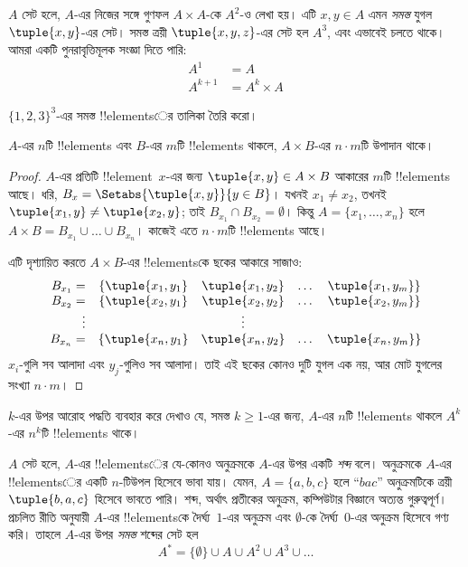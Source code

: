 \documentclass[../../../include/open-logic-section]{subfiles}
\begin{document}
\begin{ex}
$A$ সেট হলে, $A$-এর নিজের সঙ্গে গুণফল $A \times A$-কে $A^2$-ও
লেখা হয়। এটি $x, y \in A$ এমন \emph{সমস্ত} যুগল $\tuple{x, y}$-এর
সেট। সমস্ত ত্রয়ী $\tuple{x, y, z}$-এর সেট হল $A^3$, এবং এভাবেই
চলতে থাকে। আমরা একটি পুনরাবৃত্তিমূলক সংজ্ঞা দিতে পারি:
\begin{align*}
  A^1 & = A\\
  A^{k+1} & = A^k \times A
\end{align*}
\end{ex}

\begin{prob}
$\{1, 2, 3\}^3$-এর সমস্ত !!{element}sের তালিকা তৈরি করো।
\end{prob}

\begin{prop}
$A$-এর $n$টি !!{element}s এবং $B$-এর $m$টি !!{element}s থাকলে,
$A \times B$-এর $n\cdot m$টি উপাদান থাকে।
\end{prop}

\begin{proof}
$A$-এর প্রতিটি !!{element}~$x$-এর জন্য $\tuple{x, y} \in A \times B$
আকারের $m$টি !!{element}s আছে। ধরি,
$B_x = \Setabs{\tuple{x, y}}{y \in B}$। যখনই $x_1 \neq x_2$,
তখনই $\tuple{x_1, y} \neq \tuple{x_2, y}$;
তাই $B_{x_1} \cap B_{x_2} = \emptyset$। কিন্তু $A = \{x_1, \dots, x_n\}$
হলে $A \times B = B_{x_1} \cup \dots \cup B_{x_n}$।
কাজেই এতে $n\cdot m$টি !!{element}s আছে।

এটি দৃশ্যায়িত করতে $A \times B$-এর !!{element}sকে ছকের আকারে সাজাও:
\[
\begin{array}{rcccc}
  B_{x_1} = & \{\tuple{x_1, y_1} & \tuple{x_1, y_2} & \dots & \tuple{x_1, y_m}\}\\
  B_{x_2} = & \{\tuple{x_2, y_1} & \tuple{x_2, y_2} & \dots & \tuple{x_2, y_m}\}\\
  \vdots & & \vdots\\
  B_{x_n} = & \{\tuple{x_n, y_1} & \tuple{x_n, y_2} & \dots & \tuple{x_n, y_m}\}
\end{array}
\]
$x_i$-গুলি সব আলাদা এবং $y_j$-গুলিও সব আলাদা। তাই এই ছকের
কোনও দুটি যুগল এক নয়, আর মোট যুগলের সংখ্যা $n\cdot m$।
\end{proof}

\begin{prob}
$k$-এর উপর আরোহ পদ্ধতি ব্যবহার করে দেখাও যে, সমস্ত $k \ge 1$-এর জন্য,
$A$-এর $n$টি !!{element}s থাকলে $A^k$-এর $n^k$টি !!{element}s থাকে।
\end{prob}

\begin{ex}
$A$ সেট হলে, $A$-এর !!{element}sের যে-কোনও অনুক্রমকে $A$-এর উপর
একটি \emph{শব্দ} বলে। অনুক্রমকে $A$-এর !!{element}sের একটি
$n$-টিউপল হিসেবে ভাবা যায়। যেমন, $A = \{a, b, c\}$ হলে ``$bac$''
অনুক্রমটিকে ত্রয়ী~$\tuple{b, a, c}$ হিসেবে ভাবতে পারি। শব্দ, অর্থাৎ
প্রতীকের অনুক্রম, কম্পিউটার বিজ্ঞানে অত্যন্ত গুরুত্বপূর্ণ। প্রচলিত রীতি
অনুযায়ী $A$-এর !!{element}sকে দৈর্ঘ্য~$1$-এর অনুক্রম এবং
$\emptyset$-কে দৈর্ঘ্য~$0$-এর অনুক্রম হিসেবে গণ্য করি।
তাহলে $A$-এর উপর \emph{সমস্ত} শব্দের সেট হল
\[
A^* = \{\emptyset\} \cup A \cup A^2 \cup A^3 \cup \dots
\]
\end{ex}
\end{document}
